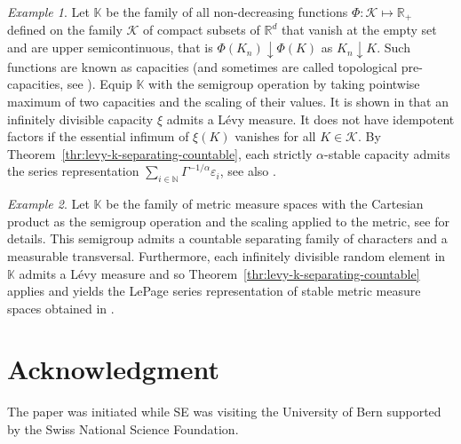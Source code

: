 \documentclass[12pt]{amsart}
\numberwithin{equation}{section}
\numberwithin{figure}{section}
\theoremstyle{plain} \newtheorem{theorem}{Theorem}[section]
\theoremstyle{plain} \newtheorem{proposition}[theorem]{Proposition}
\theoremstyle{plain} \newtheorem{lemma}[theorem]{Lemma}
\theoremstyle{plain} \newtheorem{corollary}[theorem]{Corollary}
\theoremstyle{definition} \newtheorem{definition}[theorem]{Definition}
\theoremstyle{definition} \newtheorem{notation}[theorem]{Notation}
\theoremstyle{remark} \newtheorem{remark}[theorem]{Remark}
\theoremstyle{remark} \newtheorem{example}[theorem]{Example}
\theoremstyle{definition} \newtheorem{assumption}{Assumption}
\newcommand{\bK}{\mathbb{K}}
\newcommand{\bN}{\mathbb{N}}
\newcommand{\bR}{\mathbb{R}}
\newcommand{\cK}{\mathcal{K}}
\renewcommand{\epsilon}{\varepsilon}
\newcommand{\eps}{\epsilon}
\begin{document}
\begin{example}
  Let $\bK$ be the family of all non-decreasing functions
  $\Phi:\cK\mapsto\bR_+$ defined on the family $\cK$ of compact
  subsets of $\bR^d$ that vanish at the empty set and are upper
  semicontinuous, that is $\Phi(K_n)\downarrow\Phi(K)$ as
  $K_n\downarrow K$. Such functions are known as capacities (and
  sometimes are called topological pre-capacities, see
  \cite{MR1814344}). Equip $\bK$ with the semigroup operation by
  taking pointwise maximum of two capacities and the scaling of their
  values. It is shown in \cite{nor86} that an infinitely divisible
  capacity $\xi$ admits a L\'evy measure. It does not have idempotent
  factors if the essential infimum of $\xi(K)$ vanishes for all
  $K\in\cK$. By Theorem~\ref{thr:levy-k-separating-countable}, each
  strictly $\alpha$-stable capacity admits the series representation
  $\sum_{i \in \bN} \Gamma^{-1/\alpha}\eps_i$, see also
  \cite[Th.~4.1]{mol:strok15}.
\end{example}

\begin{example}
  Let $\bK$ be the family of metric measure spaces with the Cartesian
  product as the semigroup operation and the scaling applied to the
  metric, see \cite{evan:mol15} for details. This semigroup admits a
  countable separating family of characters and a measurable
  transversal. Furthermore, each infinitely divisible random element
  in $\bK$ admits a L\'evy measure and so
  Theorem~\ref{thr:levy-k-separating-countable} applies and yields the
  LePage series representation of stable metric measure spaces
  obtained in \cite[Th.~10.3]{evan:mol15}.
\end{example}


\section*{Acknowledgment}
\label{sec:acknowledgment}

The paper was initiated while SE was visiting the University of Bern
supported by the Swiss National Science Foundation. 


% 
% 
%
\end{document}
